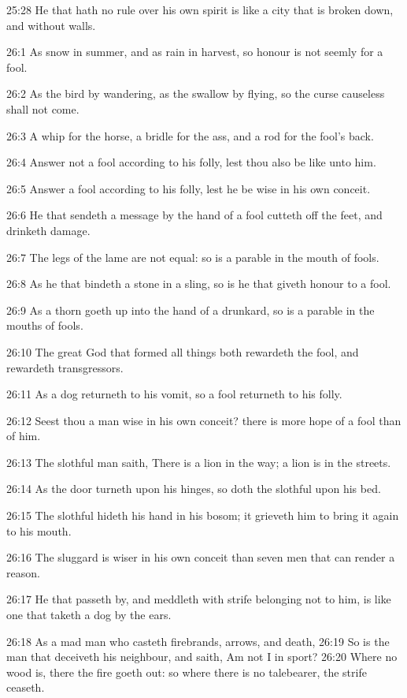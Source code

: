 25:28 He that hath no rule over his own spirit is like a city that is broken down, and without walls.

26:1 As snow in summer, and as rain in harvest, so honour is not seemly for a fool.

26:2 As the bird by wandering, as the swallow by flying, so the curse causeless shall not come.

26:3 A whip for the horse, a bridle for the ass, and a rod for the fool's back.

26:4 Answer not a fool according to his folly, lest thou also be like unto him.

26:5 Answer a fool according to his folly, lest he be wise in his own conceit.

26:6 He that sendeth a message by the hand of a fool cutteth off the feet, and drinketh damage.

26:7 The legs of the lame are not equal: so is a parable in the mouth of fools.

26:8 As he that bindeth a stone in a sling, so is he that giveth honour to a fool.

26:9 As a thorn goeth up into the hand of a drunkard, so is a parable in the mouths of fools.

26:10 The great God that formed all things both rewardeth the fool, and rewardeth transgressors.

26:11 As a dog returneth to his vomit, so a fool returneth to his folly.

26:12 Seest thou a man wise in his own conceit? there is more hope of a fool than of him.

26:13 The slothful man saith, There is a lion in the way; a lion is in the streets.

26:14 As the door turneth upon his hinges, so doth the slothful upon his bed.

26:15 The slothful hideth his hand in his bosom; it grieveth him to bring it again to his mouth.

26:16 The sluggard is wiser in his own conceit than seven men that can render a reason.

26:17 He that passeth by, and meddleth with strife belonging not to him, is like one that taketh a dog by the ears.

26:18 As a mad man who casteth firebrands, arrows, and death, 26:19 So is the man that deceiveth his neighbour, and saith, Am not I in sport?  26:20 Where no wood is, there the fire goeth out: so where there is no talebearer, the strife ceaseth.

